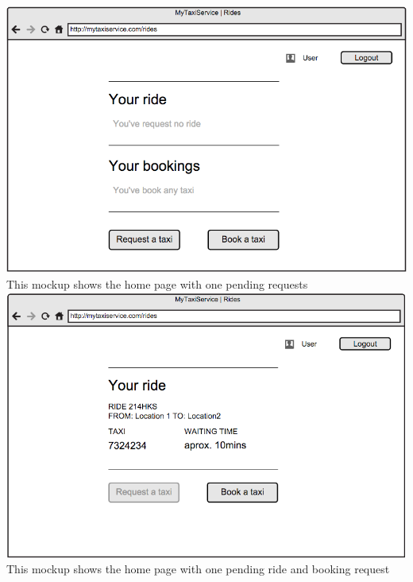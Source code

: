 \documentclass[11pt,titlepage]{article} %
\begin{document}
        \includegraphics[scale=0.52]{viewEmptyInt.png}\newline
        \newpage
        \noindent
        This mockup shows the home page with one pending requests\newline
        \newline
        \includegraphics[scale=0.52]{viewReqInt.png}\newline
        \newpage
        \noindent
        This mockup shows the home page with one pending ride and booking request\newline
        \newline
\end{document}
